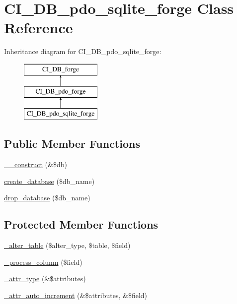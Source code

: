 \hypertarget{class_c_i___d_b__pdo__sqlite__forge}{}\section{C\+I\+\_\+\+D\+B\+\_\+pdo\+\_\+sqlite\+\_\+forge Class Reference}
\label{class_c_i___d_b__pdo__sqlite__forge}
Inheritance diagram for C\+I\+\_\+\+D\+B\+\_\+pdo\+\_\+sqlite\+\_\+forge\+:\begin{figure}[H]
\begin{center}
\leavevmode
\includegraphics[height=3.000000cm]{class_c_i___d_b__pdo__sqlite__forge}
\end{center}
\end{figure}
\subsection*{Public Member Functions}
\begin{DoxyCompactItemize}
\item 
\mbox{\hyperlink{class_c_i___d_b__pdo__sqlite__forge_a32f804812e66a892ba61c22224423d04}{\+\_\+\+\_\+construct}} (\&\$db)
\item 
\mbox{\hyperlink{class_c_i___d_b__pdo__sqlite__forge_a78d082ec6c0671949de9b489b6f5ad81}{create\+\_\+database}} (\$db\+\_\+name)
\item 
\mbox{\hyperlink{class_c_i___d_b__pdo__sqlite__forge_af66ce05b125dbe42af29445e54ba77c8}{drop\+\_\+database}} (\$db\+\_\+name)
\end{DoxyCompactItemize}
\subsection*{Protected Member Functions}
\begin{DoxyCompactItemize}
\item 
\mbox{\hyperlink{class_c_i___d_b__pdo__sqlite__forge_aea330402dca6f4190ee3a023b2fca237}{\+\_\+alter\+\_\+table}} (\$alter\+\_\+type, \$table, \$field)
\item 
\mbox{\hyperlink{class_c_i___d_b__pdo__sqlite__forge_a6a330b5cedd77fb4bbac101163e3fcbd}{\+\_\+process\+\_\+column}} (\$field)
\item 
\mbox{\hyperlink{class_c_i___d_b__pdo__sqlite__forge_a956de01e531adcd715ce9edec5c4a6c0}{\+\_\+attr\+\_\+type}} (\&\$attributes)
\item 
\mbox{\hyperlink{class_c_i___d_b__pdo__sqlite__forge_a87d0e152f3222319f453b5927c5e07b1}{\+\_\+attr\+\_\+auto\+\_\+increment}} (\&\$attributes, \&\$field)
\end{DoxyCompactItemize}
